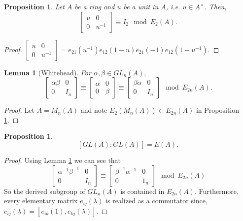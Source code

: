 \documentclass[12pt]{report}
\numberwithin{equation}{section}
\newcounter{dummy} \numberwithin{dummy}{section}
\newtheorem{lemma}[dummy]{Lemma}
\newtheorem{proposition}[dummy]{Proposition}
\begin{document}
	\begin{proposition}\label{whiteheadsimple}
		Let $A$ be a ring and $u$ be a unit in $A$, i.e. $u \in A^\times$. Then,
		\[ {\displaystyle {\begin{bmatrix}u&0\\0&u^{-1}\end{bmatrix}}} \equiv I_2 \mod E_2(A).\]
	\end{proposition}
	\begin{proof}
		${\displaystyle {\begin{bmatrix}u&0\\0&u^{-1}\end{bmatrix}}=e_{21}(u^{-1})e_{12}(1-u)e_{21}(-1)e_{12}(1-u^{-1}).}$
	\end{proof}
	\begin{lemma}[Whitehead]\label{whiteheadmain}
		For $\alpha,\beta \in GL_n(A),$ \[ \begin{bmatrix}
			\alpha \beta & 0 \\ 0 & I_n
		\end{bmatrix} \equiv \begin{bmatrix} \alpha & 0 \\ 0 & \beta
		\end{bmatrix} \equiv \begin{bmatrix}
			\beta \alpha  & 0 \\ 0 & I_n 
		\end{bmatrix} \mod E_{2n} (A).\]
	\end{lemma}
	\begin{proof}
		Let $A=M_n(A)$ and note $E_2(M_n(A) ) \subset E_{2n}(A)$ in Proposition \ref{whiteheadsimple}.
	\end{proof}
		\begin{proposition}
		\[ [GL(A):GL(A)]=E(A) .\]
	\end{proposition}
	\begin{proof}
		Using Lemma \ref{whiteheadmain} we can see that \[ \begin{bmatrix}
			\alpha^{-1}\beta^{-1} & 0 \\ 0 & I_n
		\end{bmatrix} \equiv \begin{bmatrix}
			\beta^{-1} \alpha^{-1 } & 0 \\
			0 & 1_n
		\end{bmatrix} \mod E_{2n}(A)\]
		So the derived subgroup of $GL_n(A)$ is contained in $E_{2n}(A)$. Furthermore, every elementary matrix $e_{ij}(\lambda)$ is realized as a commutator since, $e_{ij}(\lambda)=[e_{ik}(1 ), e_{kj} (\lambda)]$.
	\end{proof}	
	
\end{document}
